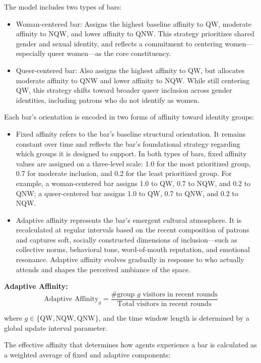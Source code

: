 \documentclass{article}
\begin{document}
The model includes two types of bars:

\begin{itemize}
    \item Woman-centered bar: Assigns the highest baseline affinity to QW, moderate affinity to NQW, and lower affinity to QNW. This strategy prioritizes shared gender and sexual identity, and reflects a commitment to centering women—especially queer women—as the core constituency.
    \item Queer-centered bar: Also assigns the highest affinity to QW, but allocates moderate affinity to QNW and lower affinity to NQW. While still centering QW, this strategy shifts toward broader queer inclusion across gender identities, including patrons who do not identify as women.
\end{itemize}

Each bar's orientation is encoded in two forms of affinity toward identity groups:

\begin{itemize}
    \item Fixed affinity refers to the bar’s baseline structural orientation. It remains constant over time and reflects the bar’s foundational strategy regarding which groups it is designed to support. In both types of bars, fixed affinity values are assigned on a three-level scale: 1.0 for the most prioritized group, 0.7 for moderate inclusion, and 0.2 for the least prioritized group. For example, a woman-centered bar assigns 1.0 to QW, 0.7 to NQW, and 0.2 to QNW; a queer-centered bar assigns 1.0 to QW, 0.7 to QNW, and 0.2 to NQW.
    \item Adaptive affinity represents the bar’s emergent cultural atmosphere. It is recalculated at regular intervals based on the recent composition of patrons and captures soft, socially constructed dimensions of inclusion—such as collective norms, behavioral tone, word-of-mouth reputation, and emotional resonance. Adaptive affinity evolves gradually in response to who actually attends and shapes the perceived ambiance of the space.
\end{itemize}

\textbf{Adaptive Affinity:}
\[
\text{Adaptive Affinity}_g = \frac{\#\text{group } g \text{ visitors in recent rounds}}{\text{Total visitors in recent rounds}}
\]

where $g \in \{\text{QW}, \text{NQW}, \text{QNW}\}$, and the time window length is determined by a global update interval parameter.

The effective affinity that determines how agents experience a bar is calculated as a weighted average of fixed and adaptive components:
\end{document}
